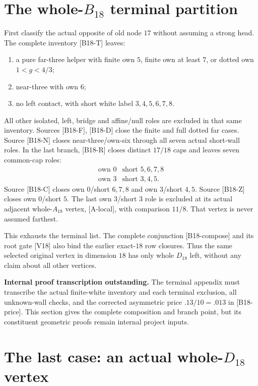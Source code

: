 \documentclass[11pt]{article}
\theoremstyle{definition}
\theoremstyle{remark}
\newcommand{\src}[1]{\textnormal{\textsf{[#1]}}}
\newcommand{\pending}[1]{\par\smallskip\noindent
  {\color{red!65!black}\textbf{Internal proof transcription outstanding.} #1}\par\smallskip}
\begin{document}
\section{The whole-\(B_{18}\) terminal partition}
\label{sec:b18}
First classify the actual opposite of old node \(17\) without
assuming a strong head. The complete inventory \src{B18-T} leaves:
\begin{enumerate}[label=(\roman*)]
\item a pure far-three helper with finite own \(5\), finite own
 at least \(7\), or dotted own \(1<g<4/3\);
\item near-three with own \(6\);
\item no left contact, with short white label \(3,4,5,6,7,8\).
\end{enumerate}
All other isolated, left, bridge and affine/null roles are
excluded in that same inventory.
Sources \src{B18-F}, \src{B18-D} close the finite and full
dotted far cases. Source \src{B18-N} closes near-three/own-six
through all seven actual short-wall roles.
In the last branch, \src{B18-R} closes distinct \(17/18\)
caps and leaves seven common-cap roles:
\[
\begin{array}{c|c}
\text{own }0&\text{short }5,6,7,8\\
\text{own }3&\text{short }3,4,5.
\end{array}
\]
Source \src{B18-C} closes own \(0\)/short \(6,7,8\) and
own \(3\)/short \(4,5\). Source \src{B18-Z} closes
own \(0\)/short \(5\). The last own \(3\)/short \(3\)
role is excluded at its actual adjacent whole-\(A_{18}\)
vertex, \src{A-local}, with comparison \(11/8\).
That vertex is never assumed farthest.

This exhausts the terminal list. The complete conjunction
\src{B18-compose} and its root gate \src{V18} also bind the
earlier exact-\(18\) row closures. Thus the same selected
original vertex in dimension \(18\) has only whole \(D_{18}\)
left, without any claim about all other vertices.
\pending{The terminal appendix must transcribe the actual finite-white inventory
and each terminal exclusion, all unknown-wall checks, and the
corrected asymmetric price \(.13/10=.013\) in \src{B18-price}.
This section gives the complete composition and branch point,
but its constituent geometric proofs remain internal project inputs.}

\section{The last case: an actual whole-\(D_{18}\) vertex}
\label{sec:d18-setup}
\end{document}
